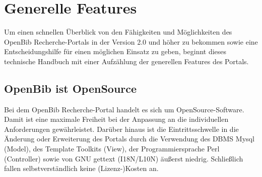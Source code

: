 \documentclass[11pt, twoside, a4paper, BCOR8mm, DIV12, bibtotoc,idxtotoc]{scrbook}
\begin{document}
\mainmatter


\chapter{Generelle Features}
Um einen schnellen Überblick von den Fähigkeiten und Möglichkeiten 
des OpenBib Recherche-Portals in der Version 2.0 und höher zu
bekommen sowie eine Entscheidungshilfe für einen möglichen Einsatz
zu geben, beginnt dieses technische Handbuch mit einer Aufzählung der
generellen Features des Portals.

\section{OpenBib ist OpenSource}
Bei dem OpenBib Recherche-Portal handelt es sich um
OpenSource-Software. Damit ist eine maximale Freiheit bei der
Anpassung an die individuellen Anforderungen gewährleistet.
Darüber hinaus ist die Eintrittsschwelle in die Änderung oder
Erweiterung des Portals durch die Ver\-wen\-dung des DBMS Mysql (Model),
des Template Toolkits (View), der Programmiersprache Perl (Control\-ler)
sowie von GNU gettext (I18N/L10N) äußerst niedrig. Schließlich
fallen selbst\-ver\-ständ\-lich keine (Lizenz-)Kosten an.
\end{document}
